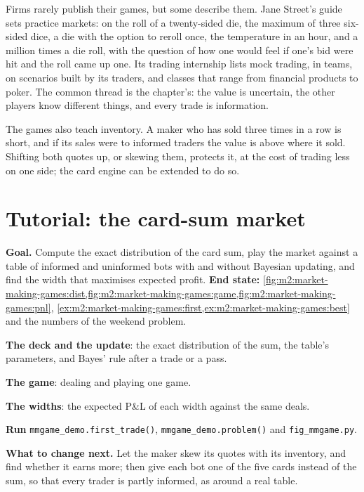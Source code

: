 Firms rarely publish their games, but some describe them. Jane Street's guide sets
practice markets: on the roll of a twenty-sided die, the maximum of three six-sided dice,
a die with the option to reroll once, the temperature in an hour, and a million times a
die roll, with the question of how one would feel if one's bid were hit and the roll came
up one. Its trading internship lists mock trading, in teams, on scenarios built by its
traders, and classes that range from financial products to poker. The common thread is the
chapter's: the value is uncertain, the other players know different things, and every
trade is information.

The games also teach inventory. A maker who has sold three times in a row is short, and
if its sales were to informed traders the value is above where it sold. Shifting both
quotes up, or skewing them, protects it, at the cost of trading less on one side; the
card engine can be extended to do so.

\section{Tutorial: the card-sum market}\label{tut:m2:market-making-games:mm}

\begin{tutorial}
\textbf{Goal.} Compute the exact distribution of the card sum, play the market against a
table of informed and uninformed bots with and without Bayesian updating, and find the
width that maximises expected profit.
\textbf{End state:} \cref{fig:m2:market-making-games:dist,fig:m2:market-making-games:game,fig:m2:market-making-games:pnl},
\cref{ex:m2:market-making-games:first,ex:m2:market-making-games:best} and the numbers of
the weekend problem.
\begin{tutsteps}
\item \textbf{The deck and the update}: the exact distribution of the sum, the table's
parameters, and Bayes' rule after a trade or a pass.
\label{lst:m2:market-making-games:update}
\item \textbf{The game}: dealing and playing one game.
\label{lst:m2:market-making-games:play}
\item \textbf{The widths}: the expected P\&L of each width against the same deals.
\label{lst:m2:market-making-games:pnl}
\item \textbf{Run} \texttt{mmgame\_demo.first\_trade()}, \texttt{mmgame\_demo.problem()}
and \texttt{fig\_mmgame.py}.
\end{tutsteps}
\textbf{What to change next.} Let the maker skew its quotes with its inventory, and find
whether it earns more; then give each bot one of the five cards instead of the sum, so
that every trader is partly informed, as around a real table.
\end{tutorial}


